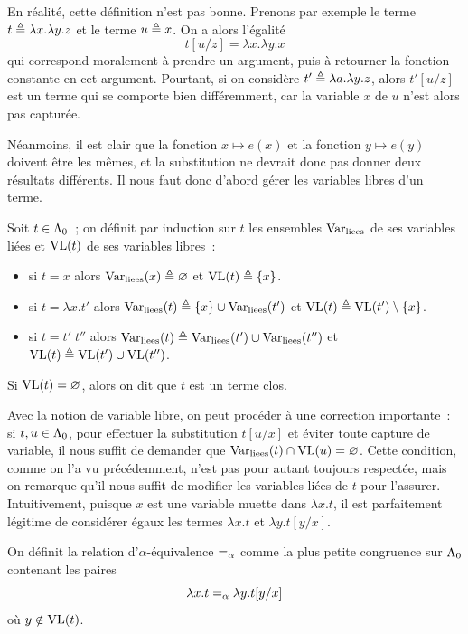 En réalité, cette définition n'est pas bonne. Prenons par exemple le terme
$t \triangleq \lambda x.\lambda y.z$ et le terme $u \triangleq x$. On a alors l'égalité
\[t[u/z] = \lambda x.\lambda y.x\]
qui correspond moralement à prendre un argument, puis à retourner la fonction
constante en cet argument. Pourtant, si on considère
$t' \triangleq \lambda a.\lambda y.z$, alors $t'[u/z]$ est un terme qui se
comporte bien différemment, car la variable $x$ de $u$ n'est alors pas capturée.

Néanmoins, il est clair que la fonction $x \mapsto e(x)$ et la fonction
$y \mapsto e(y)$ doivent être les mêmes, et la substitution ne devrait donc pas
donner deux résultats différents. Il nous faut donc d'abord gérer les variables
libres d'un terme.

\begin{definition}
  Soit $t \in \Lambda_0$~; on définit par induction sur $t$ les ensembles
  $\VLie$ de ses variables liées et $\operatorname{VL}(t)$ de ses variables libres~:
  \begin{itemize}
  \item si $t = x$ alors $\operatorname{Var}_{\mathrm{liees}}(x) \triangleq \varnothing$ et $\operatorname{VL}(t) \triangleq \{x\}$.
  \item si $t = \lambda x.t'$ alors $\operatorname{Var}_{\mathrm{liees}}(t) \triangleq \{x\} \cup \operatorname{Var}_{\mathrm{liees}}(t')$ et
    $\operatorname{VL}(t) \triangleq \operatorname{VL}(t')\setminus\{x\}$.
  \item si $t = t'\;t''$ alors $\operatorname{Var}_{\mathrm{liees}}(t) \triangleq \operatorname{Var}_{\mathrm{liees}}(t') \cup \operatorname{Var}_{\mathrm{liees}}(t'')$ et
    $\operatorname{VL}(t) \triangleq \operatorname{VL}(t') \cup \operatorname{VL}(t'')$.
  \end{itemize}

  Si $\operatorname{VL}(t) = \varnothing$, alors on dit que $t$ est un terme clos.
  \index[notation]{$\VL$}
  \index[notation]{$\VLie$}
\end{definition}

Avec la notion de variable libre, on peut procéder à une correction importante~:
si $t,u \in \Lambda_0$, pour effectuer la substitution $t[u/x]$ et éviter toute
capture de variable, il nous suffit de demander que
$\operatorname{Var}_{\mathrm{liees}}(t)\cap\operatorname{VL}(u)=\varnothing$. Cette condition, comme on l'a vu précédemment,
n'est pas pour autant toujours respectée, mais on remarque qu'il nous suffit
de modifier les variables liées de $t$ pour l'assurer. Intuitivement, puisque
$x$ est une variable muette dans $\lambda x.t$, il est parfaitement légitime
de considérer égaux les termes $\lambda x.t$ et $\lambda y.t[y/x]$.

\begin{definition}
  On définit la relation d'$\alpha$-équivalence $=_{\alpha}$ comme la plus petite
  congruence sur $\Lambda_0$ contenant les paires
  \[\lambda x.t =_{\alpha} \lambda y.t[y/x]\]
  où $y \notin \operatorname{VL}(t)$.
\end{definition}

